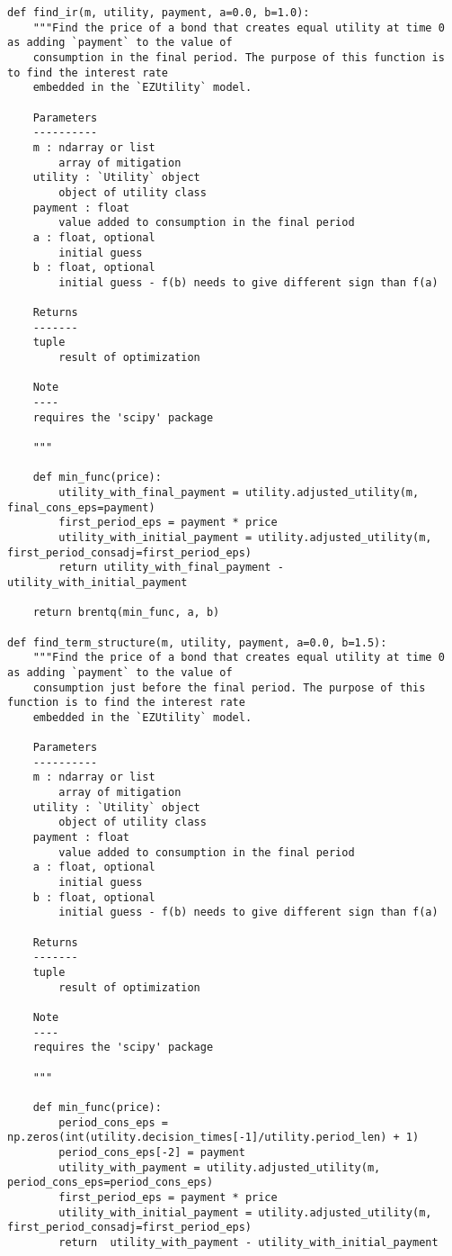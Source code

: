 \documentclass[12pt]{article}
\begin{document}
\begin{verbatim}
def find_ir(m, utility, payment, a=0.0, b=1.0):
	"""Find the price of a bond that creates equal utility at time 0 as adding `payment` to the value of
	consumption in the final period. The purpose of this function is to find the interest rate
	embedded in the `EZUtility` model.

	Parameters
	----------
	m : ndarray or list
		array of mitigation
	utility : `Utility` object
		object of utility class
	payment : float
		value added to consumption in the final period
	a : float, optional
		initial guess
	b : float, optional
		initial guess - f(b) needs to give different sign than f(a)
	
	Returns
	-------
	tuple
		result of optimization

	Note
	----
	requires the 'scipy' package

	"""

	def min_func(price):
		utility_with_final_payment = utility.adjusted_utility(m, final_cons_eps=payment)
		first_period_eps = payment * price
		utility_with_initial_payment = utility.adjusted_utility(m, first_period_consadj=first_period_eps)
		return utility_with_final_payment - utility_with_initial_payment

	return brentq(min_func, a, b)

def find_term_structure(m, utility, payment, a=0.0, b=1.5):
	"""Find the price of a bond that creates equal utility at time 0 as adding `payment` to the value of
	consumption just before the final period. The purpose of this function is to find the interest rate
	embedded in the `EZUtility` model.

	Parameters
	----------
	m : ndarray or list
		array of mitigation
	utility : `Utility` object
		object of utility class
	payment : float
		value added to consumption in the final period
	a : float, optional
		initial guess
	b : float, optional
		initial guess - f(b) needs to give different sign than f(a)
	
	Returns
	-------
	tuple
		result of optimization

	Note
	----
	requires the 'scipy' package

	"""

	def min_func(price):
		period_cons_eps = np.zeros(int(utility.decision_times[-1]/utility.period_len) + 1)
		period_cons_eps[-2] = payment
		utility_with_payment = utility.adjusted_utility(m, period_cons_eps=period_cons_eps)
		first_period_eps = payment * price
		utility_with_initial_payment = utility.adjusted_utility(m, first_period_consadj=first_period_eps)
		return  utility_with_payment - utility_with_initial_payment


\end{verbatim}
\end{document}
